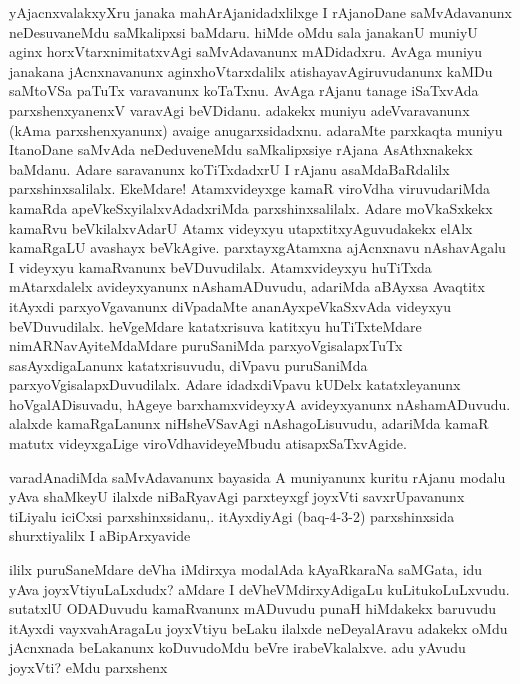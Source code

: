 
\begin{artha}
yAjacnxvalakxyXru janaka mahArAjanidadxlilxge I rAjanoDane saMvAdavanunx neDesuvaneMdu saMkalipxsi baMdaru. hiMde oMdu sala janakanU muniyU aginx horxVtarxnimitatxvAgi saMvAdavanunx mADidadxru. AvAga muniyu janakana jAcnxnavanunx aginxhoVtarxdalilx atishayavAgiruvudanunx kaMDu saMtoVSa paTuTx varavanunx koTaTxnu. AvAga rAjanu tanage iSaTxvAda parxshenxyanenxV varavAgi beVDidanu. adakekx muniyu adeVvaravanunx (kAma parxshenxyanunx) avaige anugarxsidadxnu. adaraMte parxkaqta muniyu ItanoDane saMvAda neDeduveneMdu saMkalipxsiye rAjana AsAthxnakekx baMdanu. Adare saravanunx koTiTxdadxrU I rAjanu asaMdaBaRdalilx parxshinxsalilalx. EkeMdare! Atamxvideyxge kamaR viroVdha viruvudariMda kamaRda apeVkeSxyilalxvAdadxriMda parxshinxsalilalx. Adare moVkaSxkekx kamaRvu beVkilalxvAdarU Atamx videyxyu utapxtitxyAguvudakekx elAlx kamaRgaLU avashayx beVkAgive. parxtayxgAtamxna ajAcnxnavu nAshavAgalu I videyxyu kamaRvanunx beVDuvudilalx. Atamxvideyxyu huTiTxda mAtarxdalelx avideyxyanunx nAshamADuvudu, adariMda aBAyxsa Avaqtitx itAyxdi parxyoVgavanunx diVpadaMte ananAyxpeVkaSxvAda videyxyu beVDuvudilalx. heVgeMdare katatxrisuva katitxyu huTiTxteMdare nimARNavAyiteMdaMdare puruSaniMda parxyoVgisalapxTuTx sasAyxdigaLanunx katatxrisuvudu, diVpavu puruSaniMda parxyoVgisalapxDuvudilalx. Adare idadxdiVpavu kUDelx katatxleyanunx hoVgalADisuvadu, hAgeye barxhamxvideyxyA avideyxyanunx nAshamADuvudu. alalxde kamaRgaLanunx niHsheVSavAgi nAshagoLisuvudu, adariMda kamaR matutx videyxgaLige viroVdhavideyeMbudu atisapxSaTxvAgide. 
\end{artha}%

\begin{artha}
varadAnadiMda saMvAdavanunx bayasida A muniyanunx kuritu rAjanu modalu yAva shaMkeyU ilalxde niBaRyavAgi parxteyxgf joyxVti savxrUpavanunx tiLiyalu iciCxsi parxshinxsidanu,. \stext  itAyxdiyAgi (baq-4-3-2) parxshinxsida shurxtiyalilx I aBipArxyavide 
\end{artha}


\begin{artha}
ililx puruSaneMdare deVha iMdirxya modalAda kAyaRkaraNa saMGata, idu yAva joyxVtiyuLaLxdudx? aMdare I deVheVMdirxyAdigaLu kuLitukoLuLxvudu. sutatxlU ODADuvudu kamaRvanunx mADuvudu punaH hiMdakekx baruvudu itAyxdi vayxvahAragaLu joyxVtiyu beLaku ilalxde neDeyalAravu adakekx oMdu jAcnxnada beLakanunx koDuvudoMdu beVre irabeVkalalxve. adu yAvudu joyxVti? eMdu parxshenx 
\end{artha}

